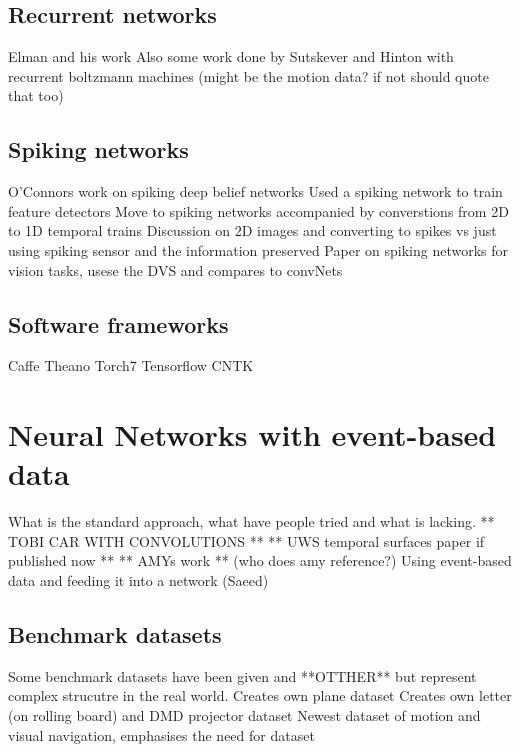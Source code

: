 \pagebreak
\subsection{Recurrent networks}  %
Elman and his work\cite{elman1990}
Also some work done by Sutskever and Hinton with recurrent boltzmann machines (might be the motion data? if not should quote that too)\cite{sutskever2009recurrent}

\pagebreak
\subsection{Spiking networks}    %
O'Connors work on spiking deep belief networks \cite{OConnor2013}
Used a spiking network to train feature detectors \cite{afshar2016investigation}
Move to spiking networks accompanied by converstions from 2D to 1D temporal trains \cite{afshar2013ripple}
Discussion on 2D images and converting to spikes vs just using spiking sensor and the information preserved \cite{akolkar2015can}
Paper on spiking networks for vision tasks, usese the DVS and compares to convNets \cite{martin2015spiking}

\pagebreak
\subsection{Software frameworks}   %
Caffe\cite{jia2014caffe} Theano Torch7 Tensorflow CNTK

\section{Neural Networks with event-based data}
What is the standard approach, what have people tried and what is lacking. \cite{OConnor2013}  ** TOBI CAR WITH CONVOLUTIONS ** ** UWS temporal surfaces paper if published now ** ** AMYs work ** (who does amy reference?)
Using event-based data and feeding it into a network (Saeed) \cite{afshar2016investigation}

\subsection{Benchmark datasets}
Some benchmark datasets have been given \cite{Gibson2014} and **OTTHER** but represent complex strucutre in the real world.
Creates own plane dataset \cite{afshar2016investigation}
Creates own letter (on rolling board) and DMD projector dataset \cite{akolkar2015can}
Newest dataset of motion and visual navigation, emphasises the need for dataset \cite{barranco2016dataset}

